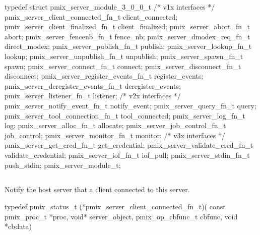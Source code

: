 \cspecificstart
\begin{codepar}
typedef struct pmix_server_module_3_0_0_t {
    /* v1x interfaces */
    pmix_server_client_connected_fn_t   client_connected;
    pmix_server_client_finalized_fn_t   client_finalized;
    pmix_server_abort_fn_t              abort;
    pmix_server_fencenb_fn_t            fence_nb;
    pmix_server_dmodex_req_fn_t         direct_modex;
    pmix_server_publish_fn_t            publish;
    pmix_server_lookup_fn_t             lookup;
    pmix_server_unpublish_fn_t          unpublish;
    pmix_server_spawn_fn_t              spawn;
    pmix_server_connect_fn_t            connect;
    pmix_server_disconnect_fn_t         disconnect;
    pmix_server_register_events_fn_t    register_events;
    pmix_server_deregister_events_fn_t  deregister_events;
    pmix_server_listener_fn_t           listener;
    /* v2x interfaces */
    pmix_server_notify_event_fn_t       notify_event;
    pmix_server_query_fn_t              query;
    pmix_server_tool_connection_fn_t    tool_connected;
    pmix_server_log_fn_t                log;
    pmix_server_alloc_fn_t              allocate;
    pmix_server_job_control_fn_t        job_control;
    pmix_server_monitor_fn_t            monitor;
    /* v3x interfaces */
    pmix_server_get_cred_fn_t           get_credential;
    pmix_server_validate_cred_fn_t      validate_credential;
    pmix_server_iof_fn_t                iof_pull;
    pmix_server_stdin_fn_t              push_stdin;
} pmix_server_module_t;
\end{codepar}
\cspecificend


\subsection{}

\summary

Notify the host server that a client connected to this server.

\format

\cspecificstart
\begin{codepar}
typedef pmix_status_t (*pmix_server_client_connected_fn_t)(
                             const pmix_proc_t *proc,
                             void* server_object,
                             pmix_op_cbfunc_t cbfunc,
                             void *cbdata)
\end{codepar}
\cspecificend


